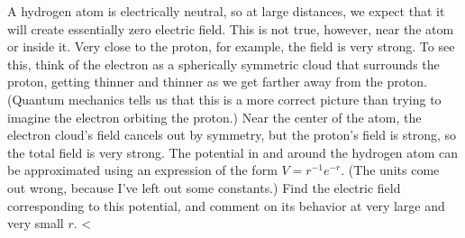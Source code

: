         A hydrogen atom is electrically neutral, so at large distances, we expect that
        it will create essentially zero electric field. This is not true, however, near
        the atom or inside it. Very close to the proton, for example, the field
        is very strong. To see this, think of the electron as a spherically
        symmetric cloud that surrounds the
        proton, getting thinner and thinner as we get farther away from the proton. (Quantum
        mechanics tells us that this is a more correct picture than trying to imagine the
        electron orbiting the proton.)  Near the center of the atom, the electron cloud's
        field cancels out by symmetry, but the proton's field is strong, so the total field
        is very strong. The potential in and around the hydrogen atom can be approximated using
        an expression of the form $V=r^{-1}e^{-r}$. (The units come out wrong, because I've
        left out some constants.) Find the electric field corresponding to this potential, and
        comment on its behavior at very large and very small $r$.
        <%
